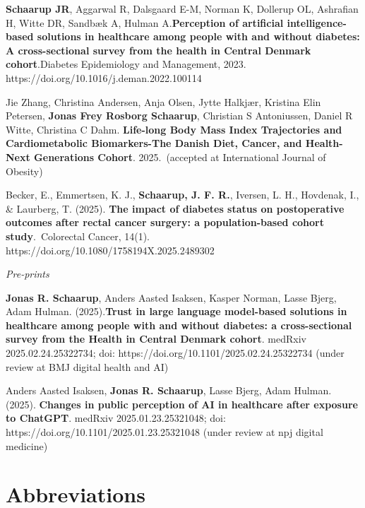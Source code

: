 \documentclass[
  a4paper,
  headsepline=true,
  open=left]{scrbook}
\begin{document}
\textbf{Schaarup JR}, Aggarwal R, Dalsgaard E-M, Norman K, Dollerup OL,
Ashrafian H, Witte DR, Sandbæk A, Hulman A.\textbf{Perception of
artificial intelligence-based solutions in healthcare among people with
and without diabetes: A cross-sectional survey from the health in
Central Denmark cohort}.Diabetes Epidemiology and Management, 2023.
https://doi.org/10.1016/j.deman.2022.100114

Jie Zhang, Christina Andersen, Anja Olsen, Jytte Halkjær, Kristina Elin
Petersen, \textbf{Jonas Frey Rosborg Schaarup}, Christian S Antoniussen,
Daniel R Witte, Christina C Dahm. \textbf{Life-long Body Mass Index
Trajectories and Cardiometabolic Biomarkers-The Danish Diet, Cancer, and
Health-Next Generations Cohort}. 2025.~(accepted at International
Journal of Obesity)

Becker, E., Emmertsen, K. J., \textbf{Schaarup, J. F. R.}, Iversen, L.
H., Hovdenak, I., \& Laurberg, T. (2025). \textbf{The impact of diabetes
status on postoperative outcomes after rectal cancer surgery: a
population-based cohort study}.~Colorectal Cancer, 14(1).
https://doi.org/10.1080/1758194X.2025.2489302

\emph{Pre-prints}

\textbf{Jonas R. Schaarup}, Anders Aasted Isaksen, Kasper Norman, Lasse
Bjerg, Adam Hulman. (2025).\textbf{Trust in large language model-based
solutions in healthcare among people with and without diabetes: a
cross-sectional survey from the Health in Central Denmark cohort}.
medRxiv 2025.02.24.25322734; doi:
https://doi.org/10.1101/2025.02.24.25322734 (under review at BMJ digital
health and AI)

Anders Aasted Isaksen, \textbf{Jonas R. Schaarup}, Lasse Bjerg, Adam
Hulman. (2025). \textbf{Changes in public perception of AI in healthcare
after exposure to ChatGPT}. medRxiv 2025.01.23.25321048; doi:
https://doi.org/10.1101/2025.01.23.25321048 (under review at npj digital
medicine)

\newpage

{\let\clearpage\relax \tableofcontents} 

\listoffigures

\listoftables


\hypertarget{abbreviations}{%
\chapter*{Abbreviations}\label{abbreviations}}
\end{document}
